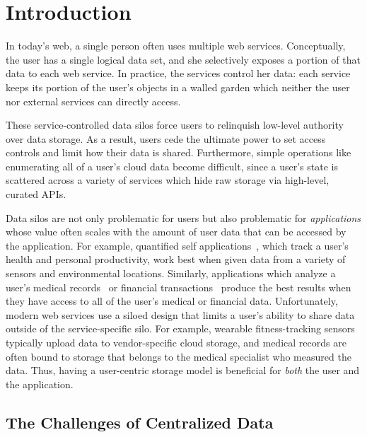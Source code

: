 \chapter{Introduction}

In today's web, a single person often 
uses multiple web services. 
Conceptually, the user has a single
logical data set, and she selectively
exposes a portion of that data to each
web service. In practice, the services
control her data: each service keeps its
portion of the user's objects in a walled
garden which neither the user nor external
services can directly access.

These service-controlled data silos force
users to relinquish low-level authority over
data storage. As a result, users cede the
ultimate power to set access controls and
limit how their data is shared. Furthermore, simple
operations like enumerating all of a user's
cloud data become difficult, since a user's
state is scattered across a variety of services
which hide raw storage via high-level, curated
APIs.

Data silos are not only problematic for
users but also problematic for
\emph{applications} whose value often scales
with the amount of user data that can be
accessed by the application. For example,
quantified self applications~\cite{beam},
which track a user's health and personal
productivity, work best when given data
from a variety of sensors and environmental
locations. Similarly, applications which analyze a
user's medical records~\cite{lark} or financial
transactions~\cite{mint} produce the best
results when they have access to 
all of the user's medical or financial data.
Unfortunately, modern web services use
a siloed design that limits a user's ability to share 
data outside of the service-specific silo. 
For example, wearable
fitness-tracking sensors typically upload data
to vendor-specific cloud storage, and medical
records are often bound to storage that belongs
to the medical specialist who measured the
data. Thus, having a user-centric storage model
is beneficial for \emph{both} the user and the application.

\section{The Challenges of Centralized Data}

